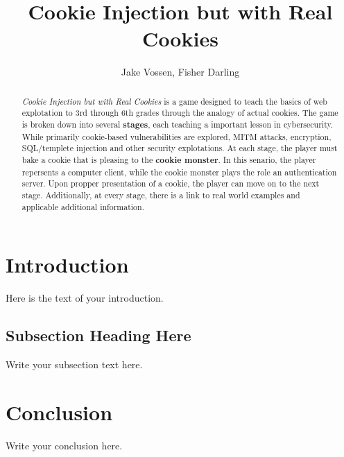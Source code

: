 \documentclass{article}
\begin{document}
\title{Cookie Injection but with Real Cookies}
\author{Jake Vossen, Fisher Darling}

\maketitle

\begin{abstract}
\textit{Cookie Injection but with Real Cookies} is a game designed to
teach the basics of web explotation to 3rd through 6th grades through
the analogy of actual cookies. The game is broken down into several
\textbf{stages}, each teaching a important lesson in
cybersecurity. While primarily cookie-based vulnerabilities are
explored, MITM attacks, encryption, SQL/templete injection and other
security explotations. At each stage, the player must bake a cookie
that is pleasing to the \textbf{cookie monster}. In this senario, the
player repersents a computer client, while the cookie monster plays
the role an authentication server. Upon propper presentation of a
cookie, the player can move on to the next stage. Additionally, at
every stage, there is a link to real world examples and applicable
additional information.
\end{abstract}

\section{Introduction}
Here is the text of your introduction.

\subsection{Subsection Heading Here}
Write your subsection text here.

\section{Conclusion}
Write your conclusion here.
\end{document}
